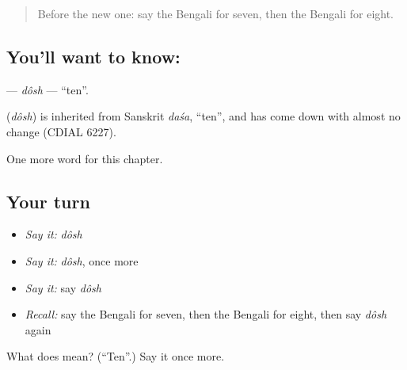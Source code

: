 \label{lesson:BN-C86-dosh}



\begin{quote}
Before the new one: say the Bengali for seven, then the Bengali for eight.
\end{quote}

\subsection*{You'll want to know: }
\textbf{} — \emph{dôsh} — \textquotedblleft{}ten\textquotedblright{}.

\begin{cousinweb}
\textbf{} (\emph{dôsh}) is inherited from Sanskrit \emph{daśa}, \textquotedblleft{}ten\textquotedblright{}, and has come down with almost no change (CDIAL 6227).
\end{cousinweb}

\begin{grammarlens}[title={What you've built}]
One more word for this chapter.
\end{grammarlens}

\subsection*{Your turn}
\begin{itemize}
\raggedright
  \item \emph{Say it:} \emph{dôsh}
  \item \emph{Say it:} \emph{dôsh}, once more
  \item \emph{Say it:} say \emph{dôsh}
  \item \emph{Recall:} say the Bengali for seven, then the Bengali for eight, then say \emph{dôsh} again
\end{itemize}

\begin{tcolorbox}[breakable,colback=teal!4,colframe=teal!35!black,title={Before you move on}]
What does  mean? (\textquotedblleft{}Ten\textquotedblright{}.) Say it once more.
\end{tcolorbox}
